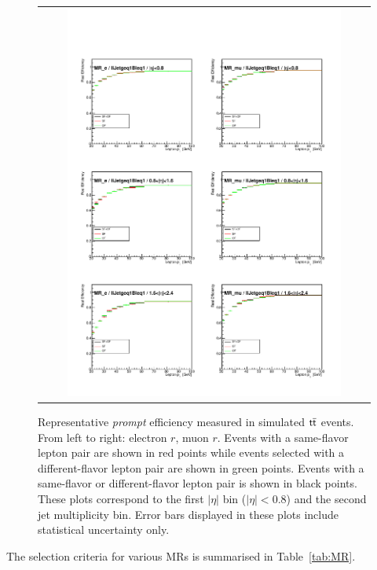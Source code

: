 \begin{figure}[tbh!]
 \begin{center}
 \begin{tabular}{c}
 \includegraphics[width=0.85\textwidth]{figures/Part3/Nonprompt/MR/real_eff}
 \end{tabular}
 \caption{Representative \emph{prompt} efficiency measured in simulated $\textsf{t}\overline{\textsf{t}}$ events. From left to right: electron $r$, muon $r$. Events with a same-flavor lepton pair are shown in red points while events selected with a different-flavor lepton pair are shown in green points. Events with a same-flavor or different-flavor lepton pair is shown in black points. These plots correspond to the first $|\eta|$ bin ($|\eta|<$0.8) and the second jet multiplicity bin. Error bars displayed in these plots include statistical uncertainty only. }
 \label{fig:real_eff}
 \end{center}
\end{figure}

The selection criteria for various \acp{MR} is summarised in Table~\ref{tab:MR}.

